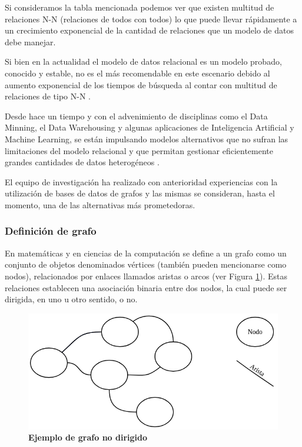 Si consideramos la tabla mencionada podemos ver que existen multitud de relaciones N-N (relaciones de todos con todos) lo que puede llevar rápidamente a un crecimiento exponencial de la cantidad de relaciones que un modelo de datos debe manejar.

Si bien en la actualidad el modelo de datos relacional es un modelo probado, conocido y estable, no es el más recomendable en este escenario debido al aumento exponencial de los tiempos de búsqueda al contar con multitud de relaciones de tipo N-N \cite{kunii1987dbms}. 

Desde hace un tiempo y con el advenimiento de disciplinas como el Data Minning, el Data Warehousing y algunas aplicaciones de Inteligencia Artificial y Machine Learning, se están impulsando modelos alternativos que no sufran las limitaciones del modelo relacional y que permitan gestionar eficientemente grandes cantidades de datos heterogéneos \cite{vicknair2010comparison}. 

El equipo de investigación ha realizado con anterioridad experiencias con la utilización de bases de datos de grafos y las mismas se consideran, hasta el momento, una de las alternativas más prometedoras.

\subsubsection{Definición de grafo}

En matemáticas y en ciencias de la computación se define a un grafo como un	conjunto de objetos denominados vértices (también pueden mencionarse como nodos), relacionados por enlaces llamados aristas o arcos (ver Figura \ref{fig:grafo}). Estas relaciones establecen una asociación binaria entre dos nodos, la cual puede ser dirigida, en uno u otro sentido, o no.

\begin{figure}
	\centering
	\includegraphics[width=0.7\linewidth]{images/grafo}
	\caption{\textbf{Ejemplo de grafo no dirigido}}
	\label{fig:grafo}
\end{figure}

